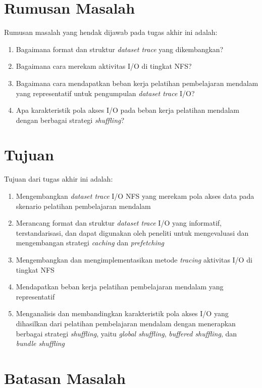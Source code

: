 \section{Rumusan Masalah}

Rumusan masalah yang hendak dijawab pada tugas akhir ini adalah:

\begin{enumerate}
    \item Bagaimana format dan struktur \textit{dataset trace} yang dikembangkan?
    \item Bagaimana cara merekam aktivitas I/O di tingkat NFS?
    \item Bagaimana cara mendapatkan beban kerja pelatihan pembelajaran mendalam yang representatif untuk pengumpulan \textit{dataset trace} I/O?
    \item Apa karakteristik pola akses I/O pada beban kerja pelatihan mendalam dengan berbagai strategi \textit{shuffling}?
\end{enumerate}

\section{Tujuan}

Tujuan dari tugas akhir ini adalah:

\begin{enumerate}
    \item Mengembangkan \textit{dataset trace} I/O NFS yang merekam pola akses data pada skenario pelatihan pembelajaran mendalam
    \item Merancang format dan struktur \textit{dataset trace} I/O yang informatif, terstandarisasi, dan dapat digunakan oleh peneliti untuk mengevaluasi dan mengembangan strategi \textit{caching} dan \textit{prefetching}
    \item Mengembangkan dan mengimplementasikan metode \textit{tracing} aktivitas I/O di tingkat NFS
    \item Mendapatkan beban kerja pelatihan pembelajaran mendalam yang representatif
    \item Menganalisis dan membandingkan karakteristik pola akses I/O yang dihasilkan dari pelatihan pembelajaran mendalam dengan menerapkan berbagai strategi \textit{shuffling}, yaitu \textit{global shuffling}, \textit{buffered shuffling}, dan \textit {bundle shuffling}
\end{enumerate}

\section{Batasan Masalah}

